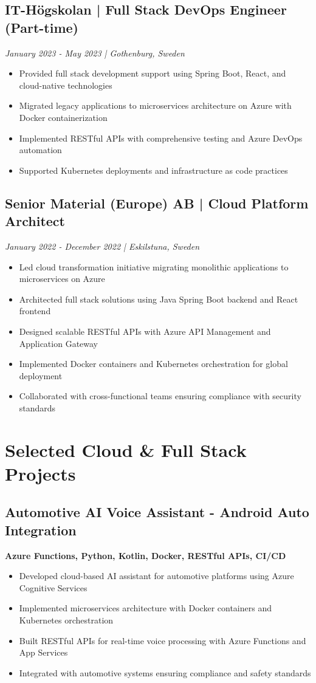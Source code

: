 \documentclass[11pt,a4paper]{article}
\begin{document}
\subsection*{IT-Högskolan | Full Stack DevOps Engineer (Part-time)}
\textit{January 2023 - May 2023 | Gothenburg, Sweden}
\begin{itemize}[noitemsep]
\item Provided full stack development support using Spring Boot, React, and cloud-native technologies
\item Migrated legacy applications to microservices architecture on Azure with Docker containerization
\item Implemented RESTful APIs with comprehensive testing and Azure DevOps automation
\item Supported Kubernetes deployments and infrastructure as code practices
\end{itemize}

\subsection*{Senior Material (Europe) AB | Cloud Platform Architect}
\textit{January 2022 - December 2022 | Eskilstuna, Sweden}
\begin{itemize}[noitemsep]
\item Led cloud transformation initiative migrating monolithic applications to microservices on Azure
\item Architected full stack solutions using Java Spring Boot backend and React frontend
\item Designed scalable RESTful APIs with Azure API Management and Application Gateway
\item Implemented Docker containers and Kubernetes orchestration for global deployment
\item Collaborated with cross-functional teams ensuring compliance with security standards
\end{itemize}

\section*{Selected Cloud \& Full Stack Projects}

\subsection{Automotive AI Voice Assistant - Android Auto Integration}
\textbf{Azure Functions, Python, Kotlin, Docker, RESTful APIs, CI/CD}
\begin{itemize}[noitemsep]
  \item Developed cloud-based AI assistant for automotive platforms using Azure Cognitive Services
  \item Implemented microservices architecture with Docker containers and Kubernetes orchestration
  \item Built RESTful APIs for real-time voice processing with Azure Functions and App Services
  \item Integrated with automotive systems ensuring compliance and safety standards
\end{itemize}
\end{document}

